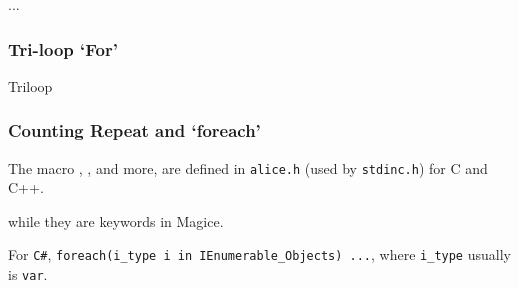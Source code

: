 	...

\subsubsection{Tri-loop `For'}
{Triloop}


\subsubsection{Counting Repeat and `foreach'}

	The macro , ,  and more, 
	are defined in \verb|alice.h| (used by \verb`stdinc.h`) for C and C++.

	while they are keywords in Magice.
	
	For \verb`C#`, \verb|foreach(i_type i in IEnumerable_Objects) ...|, where \verb`i_type` usually is \verb`var`.


